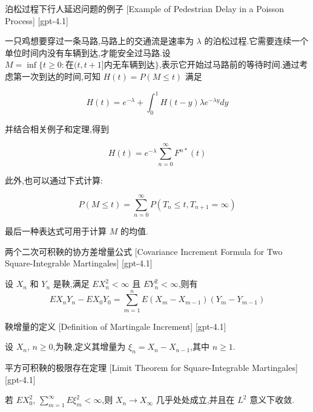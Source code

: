 \documentclass[UTF8]{ctexart}
\begin{document}
    \begin{xmp}
        {泊松过程下行人延迟问题的例子}
        [Example of Pedestrian Delay in a Poisson Process]
        [gpt-4.1]
        
一只鸡想要穿过一条马路,马路上的交通流是速率为 $\lambda$ 的泊松过程.它需要连续一个单位时间内没有车辆到达,才能安全过马路.设 $M = \inf \{ t \geq 0 : \text{在} ( t , t + 1 ] \text{内无车辆到达} \}$,表示它开始过马路前的等待时间.通过考虑第一次到达的时间,可知 $H ( t ) = P ( M \leq t )$ 满足

\[
H ( t ) = e ^ { - \lambda } + \int _ { 0 } ^ { 1 } H ( t - y ) \lambda e ^ { - \lambda y } d y
\]

并结合相关例子和定理,得到

\[
H ( t ) = e ^ { - \lambda } \sum _ { n = 0 } ^ { \infty } F ^ { n * } ( t )
\]

此外,也可以通过下式计算:

\[
P ( M \leq t ) = \sum _ { n = 0 } ^ { \infty } P ( T _ { n } \leq t , T _ { n + 1 } = \infty )
\]

最后一种表达式可用于计算 $M$ 的均值.

    \end{xmp}
    
    
    
    \begin{thm}
        {两个二次可积鞅的协方差增量公式}
        [Covariance Increment Formula for Two Square-Integrable Martingales]
        [gpt-4.1]
        
设 $X_n$ 和 $Y_n$ 是鞅,满足 $E X_n^2 < \infty$ 且 $E Y_n^2 < \infty$,则有
\[
E X_n Y_n - E X_0 Y_0 = \sum_{m=1}^n E (X_m - X_{m-1})(Y_m - Y_{m-1})
\]

    \end{thm}
    
    
    
    \begin{dfn}
        {鞅增量的定义}
        [Definition of Martingale Increment]
        [gpt-4.1]
        
设 $X_n$, $n \geq 0$,为鞅,定义其增量为 $\xi_n = X_n - X_{n-1}$,其中 $n \geq 1$.

    \end{dfn}
    
    
    
    \begin{thm}
        {平方可积鞅的极限存在定理}
        [Limit Theorem for Square-Integrable Martingales]
        [gpt-4.1]
        
若 $E X_0^2$, $\sum_{m=1}^\infty E \xi_m^2 < \infty$,则 $X_n \to X_\infty$ 几乎处处成立,并且在 $L^2$ 意义下收敛.

    \end{thm}
    
\end{document}
